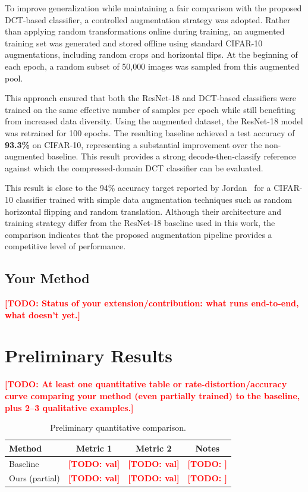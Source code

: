 \documentclass[11pt]{article}
\newcommand{\todo}[1]{\textcolor{red}{\textbf{[TODO: #1]}}}
\begin{document}
To improve generalization while maintaining a fair comparison with the proposed DCT-based classifier,
a controlled augmentation strategy was adopted. Rather than applying random transformations online during training,
an augmented training set was generated and stored offline using standard CIFAR-10 augmentations,
including random crops and horizontal flips. At the beginning of each epoch, a random subset of 50{,}000 images was sampled from this augmented pool.

This approach ensured that both the ResNet-18 and DCT-based classifiers were trained on the same effective number of samples per epoch while still benefiting from increased data diversity.
Using the augmented dataset, the ResNet-18 model was retrained for 100 epochs.
The resulting baseline achieved a test accuracy of \textbf{93.3\%} on CIFAR-10,
representing a substantial improvement over the non-augmented baseline. This result provides a strong decode-then-classify reference against which the compressed-domain DCT classifier can be evaluated.

This result is close to the 94\% accuracy target reported by Jordan~\cite{jordan2024airbench} for a CIFAR-10 classifier trained with simple data augmentation techniques such as random horizontal flipping
and random translation. Although their architecture and training strategy differ from the ResNet-18 baseline used in this work, the comparison indicates that the proposed augmentation pipeline provides a competitive level of performance.
\subsection{Your Method}
\todo{Status of your extension/contribution: what runs end-to-end, what doesn't yet.}

\section{Preliminary Results}
\label{sec:results}
\todo{At least one quantitative table or rate-distortion/accuracy curve comparing your
method (even partially trained) to the baseline, plus 2--3 qualitative examples.}

\begin{table}[h]
\centering
\caption{Preliminary quantitative comparison.}
\label{tab:prelim}
\begin{tabular}{@{}lccc@{}}
\toprule
\textbf{Method} & \textbf{Metric 1} & \textbf{Metric 2} & \textbf{Notes} \\
\midrule
Baseline        & \todo{val} & \todo{val} & \todo{} \\
Ours (partial)  & \todo{val} & \todo{val} & \todo{} \\
\bottomrule
\end{tabular}
\end{table}
\end{document}
